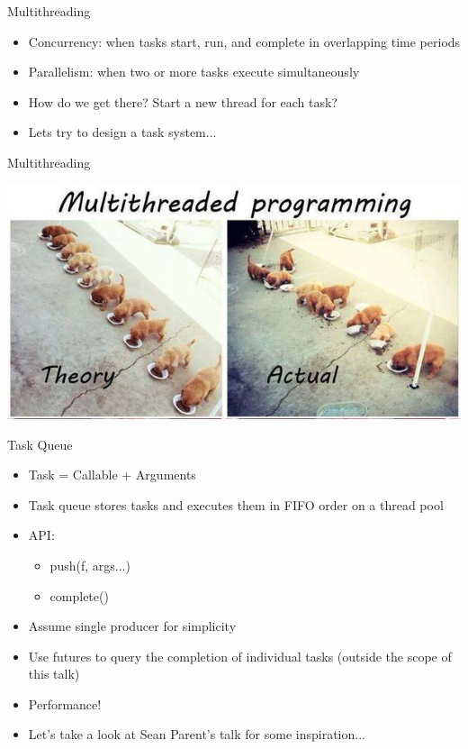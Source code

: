 \documentclass{beamer}
\begin{document}
\begin{frame}{Multithreading}
\begin{itemize}
\item Concurrency: when tasks start, run, and complete in overlapping time periods
\item Parallelism: when two or more tasks execute simultaneously
\item How do we get there? Start a new thread for each task?
\item Lets try to design a task system...
\end{itemize}
\end{frame}

\begin{frame}{Multithreading}
\begin{center}
\includegraphics[width=0.8\linewidth]{concurrency.jpeg}
\end{center}
\end{frame}

\begin{frame}{Task Queue}
\begin{itemize}
\item Task = Callable + Arguments
\item Task queue stores tasks and executes them in FIFO order on a thread pool
\item API:
\begin{itemize}
\item push(f, args...)
\item complete()
\end{itemize}
\item Assume single producer for simplicity
\item Use futures to query the completion of individual tasks (outside the scope of this talk)
\item Performance!
\item Let's take a look at Sean Parent's talk for some inspiration...
\end{itemize}
\end{frame}
\end{document}
